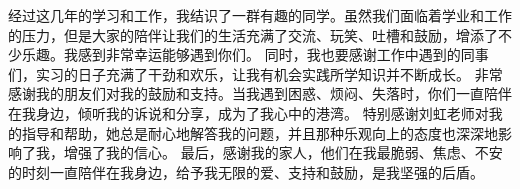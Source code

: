 \newpage
{\kaishu
  \begin{center}
    \LARGE\bfseries{}
  \end{center}
  经过这几年的学习和工作，我结识了一群有趣的同学。虽然我们面临着学业和工作的压力，但是大家的陪伴让我们的生活充满了交流、玩笑、吐槽和鼓励，增添了不少乐趣。我感到非常幸运能够遇到你们。
  同时，我也要感谢工作中遇到的同事们，实习的日子充满了干劲和欢乐，让我有机会实践所学知识并不断成长。
  非常感谢我的朋友们对我的鼓励和支持。当我遇到困惑、烦闷、失落时，你们一直陪伴在我身边，倾听我的诉说和分享，成为了我心中的港湾。
  特别感谢刘虹老师对我的指导和帮助，她总是耐心地解答我的问题，并且那种乐观向上的态度也深深地影响了我，增强了我的信心。
  最后，感谢我的家人，他们在我最脆弱、焦虑、不安的时刻一直陪伴在我身边，给予我无限的爱、支持和鼓励，是我坚强的后盾。
} 